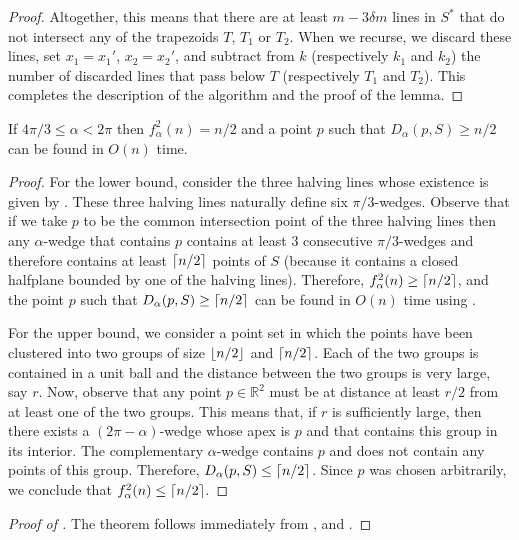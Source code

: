 \documentclass[lotsofwhite]{patmorin}
\begin{document}
\begin{proof}
Altogether, this means that there are at least $m-3\delta m$ lines in
$S^*$ that do not intersect any of the trapezoids $T$, $T_1$ or $T_2$.
When we recurse, we discard these lines, set $x_1=x_1'$, $x_2=x_2'$,
and subtract from $k$ (respectively $k_1$ and $k_2$) the number of
discarded lines that pass below $T$ (respectively $T_1$ and $T_2$).
This completes the description of the algorithm and the proof of the
lemma.
\end{proof}

\begin{lem}
If $4\pi/3\le \alpha < 2\pi$ then $f^2_\alpha(n) = n/2$ and a point
$p$ such that $D_\alpha(p,S)\ge n/2$ can be found in $O(n)$ time.
\end{lem}

\begin{proof}
For the lower bound, consider the three halving lines whose existence
is given by .  These three halving lines
naturally define six $\pi/3$-wedges.  Observe that if we take $p$ to
be the common intersection point of the three halving lines then any
$\alpha$-wedge that contains $p$ contains at least 3 consecutive
$\pi/3$-wedges and therefore contains at least $\left\lceil n/2 \right\rceil$ points of $S$
(because it contains a closed halfplane bounded by one of the
halving lines).  Therefore, $f^2_\alpha(n)\ge \left\lceil n/2 \right\rceil$, and the
point $p$ such that $D_\alpha(p,S)\ge \left\lceil n/2 \right\rceil$ can be found in $O(n)$
time using .

 
For the upper bound, we consider a point set in which the points have
been clustered into two groups of size $\left\lfloor n/2 \right\rfloor$ and $\left\lceil n/2 \right\rceil$.
Each of the two groups is contained in a unit ball and the distance
between the two groups is very large, say $r$.  Now, observe that any
point $p\in\mathbb{R}^2$ must be at distance at least $r/2$ from at
least one of the two groups.  This means that, if $r$ is sufficiently
large, then there exists a $(2\pi-\alpha)$-wedge whose apex is $p$ and
that contains this group in its interior.  The complementary
$\alpha$-wedge contains $p$ and does not contain any points of this
group.  Therefore, $D_\alpha(p,S)\le \left\lceil n/2 \right\rceil$.  Since $p$ was
chosen arbitrarily, we conclude that $f^2_\alpha(n)\le \left\lceil n/2 \right\rceil$.
\end{proof}

\begin{proof}[Proof of ] 
The theorem follows immediately from , 
and .
\end{proof}
\end{document}
